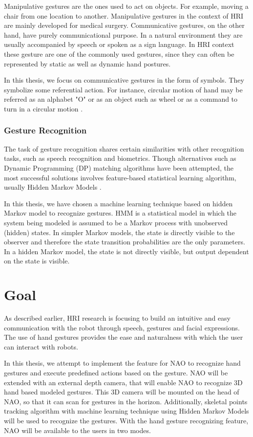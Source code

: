 Manipulative gestures are the ones used to act on objects. For example, moving a chair from one location to another. Manipulative gestures in the context of HRI are mainly developed for medical surgery. Communicative gestures, on the other hand, have purely communicational purpose. In a natural environment they are usually accompanied by speech or spoken as a sign language. In HRI context these gesture are one of the commonly used gestures, since they can often be represented by static as well as dynamic hand postures.

In this thesis, we focus on communicative gestures in the form of symbols. They symbolize some referential action. For instance, circular motion of hand may be referred as an alphabet "O" or as an object such as wheel or as a command to turn in a circular motion .


\subsection{Gesture Recognition}
The task of gesture recognition shares certain similarities with other recognition tasks, such as speech recognition and biometrics. Though alternatives such as Dynamic Programming (DP) matching algorithms have been attempted, the most successful solutions involves feature-based statistical learning algorithm, usually Hidden Markov Models \cite{5}. 

In this thesis, we have chosen a machine learning technique based on hidden Markov model to recognize gestures. HMM is a statistical model in which the system being modeled is assumed to be a Markov process with unobserved (hidden) states. In simpler Markov models, the state is directly visible to the observer and therefore the state transition probabilities are the only parameters. In a hidden Markov model, the state is not directly visible, but output dependent on the state is visible.


\chapter{Goal} As described earlier, HRI research is focusing to build an intuitive and easy communication with the robot through speech, gestures and facial expressions. The use of hand gestures provides the ease and naturalness with which the user can interact with robots.

In this thesis, we attempt to implement the feature for NAO to recognize hand gestures and execute predefined actions based on the gesture. NAO will be extended with an external depth camera, that will enable NAO to recognize 3D hand based modeled gestures. This 3D camera will be mounted on the head of NAO, so that it can scan for gestures in the horizon. Additionally, skeletal points tracking algorithm with machine learning technique using Hidden Markov Models will be used to recognize the gestures. With the hand gesture recognizing feature, NAO will be available to the users in two modes.

